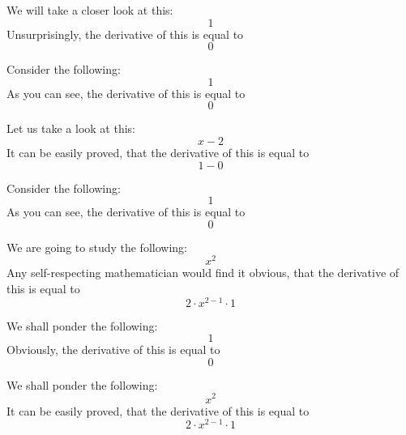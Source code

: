 \documentclass{article}
\begin{document}
We will take a closer look at this:
\begin{equation}
1 
\end{equation}
Unsurprisingly, the derivative of this is equal to
\begin{equation}
0 
\end{equation}

Consider the following:
\begin{equation}
1 
\end{equation}
As you can see, the derivative of this is equal to
\begin{equation}
0 
\end{equation}

Let us take a look at this:
\begin{equation}
x - 2 
\end{equation}
It can be easily proved, that the derivative of this is equal to
\begin{equation}
1 - 0 
\end{equation}

Consider the following:
\begin{equation}
1 
\end{equation}
As you can see, the derivative of this is equal to
\begin{equation}
0 
\end{equation}

We are going to study the following:
\begin{equation}
x ^{2 } 
\end{equation}
Any self-respecting mathematician would find it obvious, that the derivative of this is equal to
\begin{equation}
2 \cdot x ^{2 - 1 } \cdot 1 
\end{equation}

We shall ponder the following:
\begin{equation}
1 
\end{equation}
Obviously, the derivative of this is equal to
\begin{equation}
0 
\end{equation}

We shall ponder the following:
\begin{equation}
x ^{2 } 
\end{equation}
It can be easily proved, that the derivative of this is equal to
\begin{equation}
2 \cdot x ^{2 - 1 } \cdot 1 
\end{equation}
\end{document}
